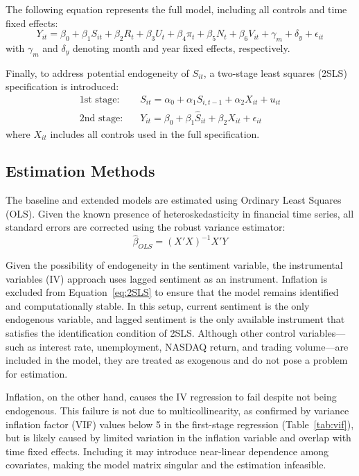 \documentclass[12pt]{article}
\begin{document}
The following equation represents the full model, including all controls and time fixed effects:
\begin{equation}
Y_{it} = \beta_0 + \beta_1 S_{it} + \beta_2 R_t + \beta_3 U_t + \beta_4 \pi_t + \beta_5 N_t + \beta_6 V_{it} + \gamma_m + \delta_y + \epsilon_{it}
\label{eq:full_model}
\end{equation}
with $\gamma_m$ and $\delta_y$ denoting month and year fixed effects, respectively.

Finally, to address potential endogeneity of $S_{it}$, a two-stage least squares (2SLS) specification is introduced:
\begin{align}
\text{1st stage:} & \quad S_{it} = \alpha_0 + \alpha_1 S_{i,t-1} + \alpha_2 X_{it} + u_{it} \\
\text{2nd stage:} & \quad Y_{it} = \beta_0 + \beta_1 \hat{S}_{it} + \beta_2 X_{it} + \epsilon_{it}
\label{eq:2SLS}
\end{align}
where $X_{it}$ includes all controls used in the full specification.

\subsection{Estimation Methods}

The baseline and extended models are estimated using Ordinary Least Squares (OLS). Given the known presence of heteroskedasticity in financial time series, all standard errors are corrected using the robust variance estimator:
\[
\hat{\beta}_{OLS} = (X'X)^{-1}X'Y
\]

Given the possibility of endogeneity in the sentiment variable, the instrumental variables (IV) approach uses lagged sentiment as an instrument. Inflation is excluded from Equation~\ref{eq:2SLS} to ensure that the model remains identified and computationally stable. In this setup, current sentiment is the only endogenous variable, and lagged sentiment is the only available instrument that satisfies the identification condition of 2SLS. Although other control variables—such as interest rate, unemployment, NASDAQ return, and trading volume—are included in the model, they are treated as exogenous and do not pose a problem for estimation.

Inflation, on the other hand, causes the IV regression to fail despite not being endogenous. This failure is not due to multicollinearity, as confirmed by variance inflation factor (VIF) values below 5 in the first-stage regression (Table~\ref{tab:vif}), but is likely caused by limited variation in the inflation variable and overlap with time fixed effects. Including it may introduce near-linear dependence among covariates, making the model matrix singular and the estimation infeasible.
\end{document}

